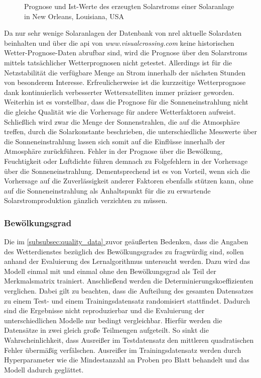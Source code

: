 \documentclass[12pt, a4paper]{article}
\newcommand*{\fullref}[1]{\hyperref[{#1}]{\autoref*{#1} \textit{\nameref*{#1}}}}
\begin{document}
\begin{figure}
\centering
\def\svgwidth{400pt}

\caption{Prognose und Ist-Werte des erzeugten Solarstroms einer Solaranlage in New Orleans, Louisiana, USA}
\label{fig:predictions_1244}
\end {figure}

Da nur sehr wenige Solaranlagen der Datenbank von \ac{nrel} aktuelle Solardaten beinhalten und über die \ac{api} von \textit{www.visualcrossing.com} keine historischen Wetter-Prognose-Daten abrufbar sind, wird die Prognose über den Solarstroms mittels tatsächlicher Wetterprognosen nicht getestet. Allerdings ist für die Netzstabilität die verfügbare Menge an Strom innerhalb der nächsten Stunden von besonderem Interesse. Erfreulicherweise ist die kurzzeitige Wetterprognose dank kontinuierlich verbesserter Wettersatelliten immer präziser geworden. Weiterhin ist es vorstellbar, dass die Prognose für die Sonneneinstrahlung nicht die gleiche Qualität wie die Vorhersage für andere Wetterfaktoren aufweist. Schließlich wird zwar die Menge der Sonnenstrahlen, die auf die Atmosphäre treffen, durch die Solarkonstante beschrieben, die unterschiedliche Messwerte über die Sonneneinstrahlung lassen sich somit auf die Einflüsse innerhalb der Atmosphäre zurückführen. Fehler in der Prognose über die Bewölkung, Feuchtigkeit oder Luftdichte führen demnach zu Folgefehlern in der Vorhersage über die Sonneneinstrahlung. Dementsprechend ist es von Vorteil, wenn sich die Vorhersage auf die Zuverlässigkeit anderer Faktoren ebenfalls stützen kann, ohne auf die Sonneneinstrahlung als Anhaltspunkt für die zu erwartende Solarstromproduktion gänzlich verzichten zu müssen.

\subsubsection{Bewölkungsgrad}

Die im \fullref{subsubsec:quality_data} zuvor geäußerten Bedenken, dass die Angaben des Wetterdienstes bezüglich des Bewölkungsgrades zu fragwürdig sind, sollen anhand der Evaluierung des Lernalgorithmus untersucht werden. Dazu wird das Modell einmal mit und einmal ohne den Bewölkungsgrad als Teil der Merkmalsmatrix trainiert. Anschließend werden die Determinierungskoeffizienten verglichen. Dabei gilt zu beachten, dass die Aufteilung des gesamten Datensatzes zu einem Test- und einem Trainingsdatensatz randomisiert stattfindet. Dadurch sind die Ergebnisse nicht reproduzierbar und die Evaluierung der unterschiedlichen Modelle nur bedingt vergleichbar. Hierfür werden die Datensätze in zwei gleich große Teilmengen aufgeteilt. So sinkt die Wahrscheinlichkeit, dass Ausreißer im Testdatensatz den mittleren quadratischen Fehler übermäßig verfälschen. Ausreißer im Trainingsdatensatz werden durch Hyperparameter wie die Mindestanzahl an Proben pro Blatt behandelt und das Modell dadurch geglättet. 
\end{document}

